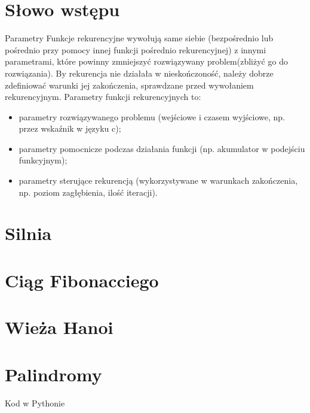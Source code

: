 
\section{Słowo wstępu}\label{sec:introduction}
\begin{frame}{Parametry}
    Funkcje rekurencyjne wywołują same siebie (bezpośrednio lub pośrednio
    przy pomocy innej funkcji pośrednio rekurencyjnej) z innymi parametrami,
    które powinny zmniejszyć rozwiązywany problem(zbliżyć go do rozwiązania).
    By rekurencja nie działała w nieskończoność, należy dobrze zdefiniować
    warunki jej zakończenia, sprawdzane przed wywołaniem rekurencyjnym.
    Parametry funkcji rekurencyjnych to:
    \begin{itemize}
        \item parametry rozwiązywanego problemu
        (wejściowe i czasem wyjściowe, np. przez wskaźnik w języku c);
        \item parametry pomocnicze podczas działania funkcji
        (np. akumulator w podejściu funkcyjnym);
        \item parametry sterujące rekurencją
        (wykorzystywane w warunkach zakończenia, np. poziom zagłębienia, ilość iteracji).
    \end{itemize}
\end{frame}


\section{Silnia}\label{sec:factorial}



\section{Ciąg Fibonacciego}\label{sec:fibonacci}



\section{Wieża Hanoi}\label{sec:hanoi}



\section{Palindromy}\label{sec:palindrome}
\begin{frame}[fragile]{Kod w Pythonie}
    
\end{frame}



